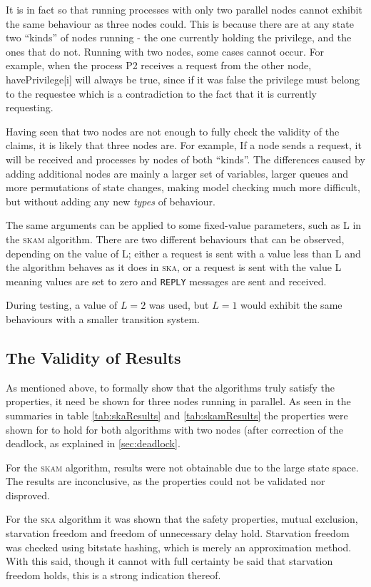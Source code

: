 \documentclass[a4paper,10pt]{llncs}
\begin{document}
It is in fact so that running processes with only two parallel nodes cannot exhibit the same behaviour as three nodes could. This is because there are at any state two ``kinds'' of nodes running - the one currently holding the privilege, and the ones that do not. Running with two nodes, some cases cannot occur. For example, when the process P2 receives a request from the other node, havePrivilege[i] will always be true, since if it was false the privilege must belong to the requestee which is a contradiction to the fact that it is currently requesting.

Having seen that two nodes are not enough to fully check the validity of the claims, it is likely that three nodes are. For example, If a node sends a request, it will be received and processes by nodes of both ``kinds''. The differences caused by adding additional nodes are mainly a larger set of variables, larger queues and more permutations of state changes, making model checking much more difficult, but without adding any new \emph{types} of behaviour.

The same arguments can be applied to some fixed-value parameters, such as L in the \textsc{skam} algorithm. There are two different behaviours that can be observed, depending on the value of L; either a request is sent with a value less than L and the algorithm behaves as it does in \textsc{ska}, or a request is sent with the value L meaning values are set to zero and \texttt{REPLY} messages are sent and received.

During testing, a value of $L=2$ was used, but $L=1$ would exhibit the same behaviours with a smaller transition system. 

\subsection{The Validity of Results}
As mentioned above, to formally show that the algorithms truly satisfy the properties, it need be shown for three nodes running in parallel.  As seen in the summaries in table \ref{tab:skaResults} and \ref{tab:skamResults} the properties were shown for to hold for both algorithms with two nodes (after correction of the deadlock, as explained in \ref{sec:deadlock}.

For the \textsc{skam} algorithm, results were not obtainable due to the large state space. The results are inconclusive, as the properties could not be validated nor disproved. 

For the \textsc{ska} algorithm it was shown that the safety properties, mutual exclusion, starvation freedom and freedom of unnecessary delay hold. Starvation freedom was checked using bitstate hashing, which is merely an approximation method. With this said, though it cannot with full certainty be said that starvation freedom holds, this is a strong indication thereof.
\end{document}
